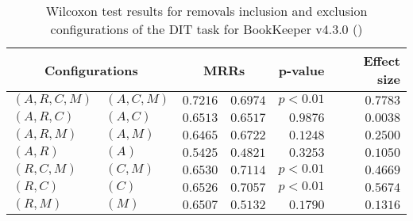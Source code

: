 
\begin{table}
\begin{spacing}{1.2}
\centering
\caption{Wilcoxon test results for removals inclusion and exclusion configurations of the DIT task for BookKeeper v4.3.0 (\ctwo)}
\label{table:versus-wilcox-bookkeeper-dit-removals}
\begin{tabular}{ll|rr|rr}
\toprule
      \multicolumn{2}{c|}{Configurations} &                \multicolumn{2}{c|}{MRRs} &             p-value & Effect size \\
\midrule
 $(A,R,C,M)$ &  $(A,C,M)$ &  $\bm{0.7216}$ &       $0.6974$ & $p<0.01$ &    $0.7783$ \\
   $(A,R,C)$ &    $(A,C)$ &       $0.6513$ &  $\bm{0.6517}$ & $0.9876$ &    $0.0038$ \\
   $(A,R,M)$ &    $(A,M)$ &       $0.6465$ &  $\bm{0.6722}$ & $0.1248$ &    $0.2500$ \\
     $(A,R)$ &      $(A)$ &  $\bm{0.5425}$ &       $0.4821$ & $0.3253$ &    $0.1050$ \\
   $(R,C,M)$ &    $(C,M)$ &       $0.6530$ &  $\bm{0.7114}$ & $p<0.01$ &    $0.4669$ \\
     $(R,C)$ &      $(C)$ &       $0.6526$ &  $\bm{0.7057}$ & $p<0.01$ &    $0.5674$ \\
     $(R,M)$ &      $(M)$ &  $\bm{0.6507}$ &       $0.5132$ & $0.1790$ &    $0.1316$ \\
\bottomrule
\end{tabular}

\end{spacing}
\end{table}


